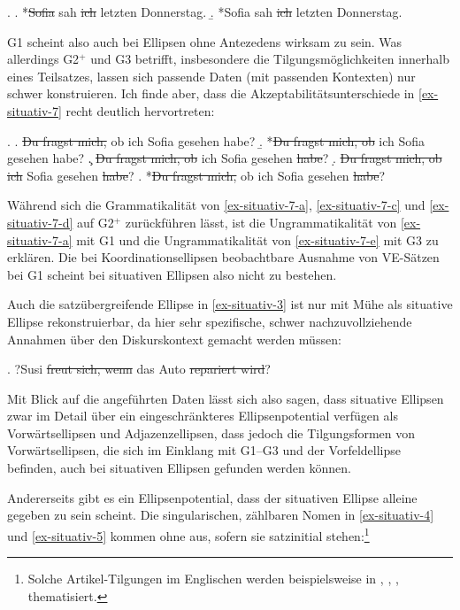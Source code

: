 \ex. \label{ex-situativ-2}
\a. *\sout{Sofia} sah \sout{ich} letzten Donnerstag.\label{ex-situativ-2-a}
\b. *Sofia sah \sout{ich} letzten Donnerstag.

G1 scheint also auch bei Ellipsen ohne Antezedens wirksam zu sein. Was allerdings G2$^+$ und G3 betrifft, insbesondere die Tilgungsmöglichkeiten innerhalb eines Teilsatzes, lassen sich passende Daten (mit passenden Kontexten) nur schwer konstruieren. Ich finde aber, dass die Akzeptabilitätsunterschiede in \ref{ex-situativ-7} recht deutlich hervortreten:

\ex. \label{ex-situativ-7}
\a. \label{ex-situativ-7-a}\sout{Du fragst mich,} ob ich Sofia gesehen habe?
\b. *\sout{Du fragst mich, ob} ich Sofia gesehen habe?\label{ex-situativ-7-b}
\c.  \label{ex-situativ-7-c}\sout{Du fragst mich, ob} ich Sofia gesehen \sout{habe}?
\d.  \label{ex-situativ-7-d}\sout{Du fragst mich, ob ich} Sofia gesehen \sout{habe}? 
\e. *\sout{Du fragst mich,} ob ich Sofia gesehen \sout{habe}?\label{ex-situativ-7-e}

Während sich die Grammatikalität von \ref{ex-situativ-7-a}, \ref{ex-situativ-7-c} und \ref{ex-situativ-7-d} auf G2$^+$ zurückführen lässt, ist die Ungrammatikalität von \ref{ex-situativ-7-a} mit G1 und die Ungrammatikalität von \ref{ex-situativ-7-e} mit G3 zu erklären. Die bei Koordinationsellipsen beobachtbare Ausnahme von VE-Sätzen bei G1 scheint bei situativen Ellipsen also nicht zu bestehen. 

Auch die satzübergreifende Ellipse in \ref{ex-situativ-3} ist nur mit Mühe als situative Ellipse rekonstruierbar, da hier sehr spezifische, schwer nachzuvollziehende Annahmen über den Diskurskontext gemacht werden müssen:

\ex. ?\label{ex-situativ-3}Susi \sout{freut sich, wenn} das Auto \sout{repariert wird}?

Mit Blick auf die angeführten Daten lässt sich also sagen, dass situative Ellipsen zwar im Detail über ein eingeschränkteres Ellipsenpotential verfügen als Vorwärtsellipsen und Adjazenzellipsen, dass jedoch die Tilgungsformen von Vorwärtsellipsen, die sich im Einklang mit G1--G3 und der Vorfeldellipse befinden, auch bei situativen Ellipsen gefunden werden können.   

Andererseits gibt es ein Ellipsenpotential, dass der situativen Ellipse alleine gegeben zu sein scheint. Die singularischen, zählbaren Nomen in \ref{ex-situativ-4} und \ref{ex-situativ-5} kommen ohne  aus, sofern sie satzinitial stehen:\footnote{Solche Artikel-Tilgungen im Englischen werden beispielsweise in \citet[736]{Morgan:73}, \citet[492]{Yanofsky:78}, \citet[64ff]{Barton:90}, \citet[728f]{Merchant:04} thematisiert.}

